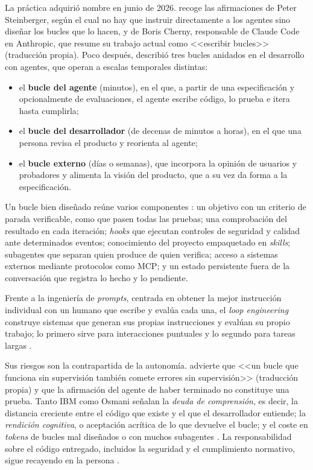 La práctica adquirió nombre en junio de 2026. \citet{osmani2026loop} recoge las afirmaciones de Peter Steinberger, según el cual no hay que instruir directamente a los agentes sino diseñar los bucles que lo hacen, y de Boris Cherny, responsable de Claude Code en Anthropic, que resume su trabajo actual como <<escribir bucles>> (traducción propia). Poco después, \citet{ng2026batch359} describió tres bucles anidados en el desarrollo con agentes, que operan a escalas temporales distintas:
\begin{itemize}
	\item el \textbf{bucle del agente} (minutos), en el que, a partir de una especificación y opcionalmente de evaluaciones, el agente escribe código, lo prueba e itera hasta cumplirla;
	\item el \textbf{bucle del desarrollador} (de decenas de minutos a horas), en el que una persona revisa el producto y reorienta al agente;
	\item el \textbf{bucle externo} (días o semanas), que incorpora la opinión de usuarios y probadores y alimenta la visión del producto, que a su vez da forma a la especificación.
\end{itemize}

Un bucle bien diseñado reúne varios componentes \citep{belcic2026loop,osmani2026loop}: un objetivo con un criterio de parada verificable, como que pasen todas las pruebas; una comprobación del resultado en cada iteración; \emph{hooks} que ejecutan controles de seguridad y calidad ante determinados eventos; conocimiento del proyecto empaquetado en \emph{skills}; subagentes que separan quien produce de quien verifica; acceso a sistemas externos mediante protocolos como MCP; y un estado persistente fuera de la conversación que registra lo hecho y lo pendiente.

Frente a la ingeniería de \emph{prompts}, centrada en obtener la mejor instrucción individual con un humano que escribe y evalúa cada una, el \emph{loop engineering} construye sistemas que generan sus propias instrucciones y evalúan su propio trabajo; lo primero sirve para interacciones puntuales y lo segundo para tareas largas \citep{belcic2026loop}.

Sus riesgos son la contrapartida de la autonomía. \citet{osmani2026loop} advierte que <<un bucle que funciona sin supervisión también comete errores sin supervisión>> (traducción propia) y que la afirmación del agente de haber terminado no constituye una prueba. Tanto IBM como Osmani señalan la \emph{deuda de comprensión}, es decir, la distancia creciente entre el código que existe y el que el desarrollador entiende; la \emph{rendición cognitiva}, o aceptación acrítica de lo que devuelve el bucle; y el coste en \emph{tokens} de bucles mal diseñados o con muchos subagentes \citep{belcic2026loop,osmani2026loop}. La responsabilidad sobre el código entregado, incluidos la seguridad y el cumplimiento normativo, sigue recayendo en la persona \citep{belcic2026loop}.

